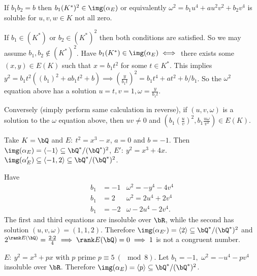 \begin{lem}\label{lem:16-5}
	If $b_1b_2 = b$ then $b_1(K^*)^2 \in \img(\alpha_E)$ or equivalently $\omega^2 = b_1u^4 + au^2v^2 + b_2v^4$ is soluble for $u,v,w \in K$ not all zero.
\end{lem}
\begin{prf}
	If $b_1 \in (K^*)$ or $b_2 \in (K^*)^2$ then both conditions are satisfied. So we may assume $b_1,b_2 \not\in (K^*)^2$. Have $b_1(K^*) \in \img(\alpha_E) \iff$ there exists some $(x,y) \in E(K)$ such that $x = b_1t^2$ for some $t \in K^*$. This implies $y^2 = b_1t^2\left((b_1)^2 + ab_1t^2 + b\right)\implies \left(\frac{y}{b_1t}\right)^2 = b_1t^4 + at^2 + b/b_1$. So the $\omega^2$ equation above has a solution $u = t, v = 1, \omega = \frac{y}{b_1t}$.

	Conversely (simply perform same calculation in reverse), if $(u,v,\omega)$ is a solution to the $\omega$ equation above, then $uv \neq 0$ and $\left(b_1\left(\frac{u}{v}\right)^2,b_1\frac{u\omega}{v^3}\right) \in E(K)$.
\end{prf}

\begin{example}
	Take $K = \bQ$ and $E:~ t^2 = x^3 - x$, $a = 0$ and $b = -1$. Then $\img(\alpha_E) = \langle -1 \rangle \subseteq \bQ^*/(\bQ^*)^2$, $E':~ y^2 = x^3 + 4x$. $\img(\alpha_E') \subseteq \langle -1,2 \rangle \subseteq \bQ^*/(\bQ^*)^2$.

	Have 
	\begin{align*}
		b_1 &= -1 & \omega^2 = -y^4 - 4v^4 \\
		b_1 &= 2 & \omega^2 = 2u^4 + 2v^4 \\
		b_1 &= -2 & \omega -2u^4 - 2v^4.
	\end{align*}
	The first and third equations are insoluble over $\bR$, while the second has solution $(u,v,\omega) = (1,1,2)$. Therefore $\img(\alpha_{E'}) = \langle 2 \rangle \subseteq \bQ^*/(\bQ^*)^2$ and $2^{\rank E(\bQ)} = \frac{2 \cdot 2}{4} \implies \rank E(\bQ) = 0 \implies 1$ is not a congruent number.
\end{example}

\begin{example}
	$E:~ y^2 = x^3 + px$ with $p$ prime $p \equiv 5 ~(\mod 8)$. Let $b_1 = -1,$ $\omega^2 = -u^4 - pv^4$ insoluble over $\bR$. Therefore $\img(\alpha_E) = \langle p \rangle\subseteq \bQ^*/(\bQ^*)^2$.
\end{example}

